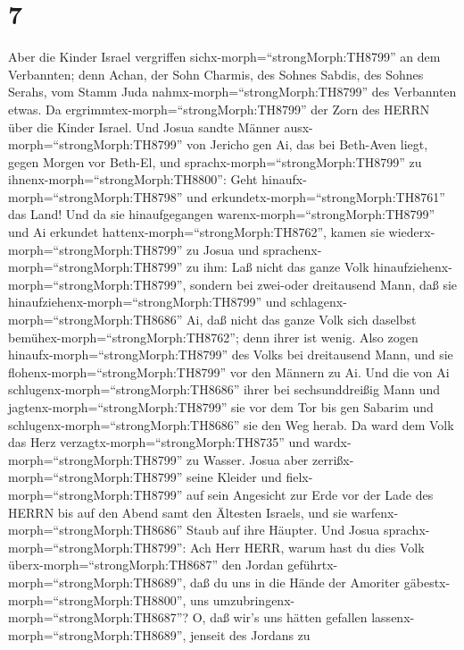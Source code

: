\hypertarget{section-6}{%
\section{7}\label{section-6}}

 Aber die Kinder Israel vergriffen
sichx-morph=``strongMorph:TH8799'' an dem Verbannten; denn Achan, der
Sohn Charmis, des Sohnes Sabdis, des Sohnes Serahs, vom Stamm Juda
nahmx-morph=``strongMorph:TH8799'' des Verbannten etwas. Da
ergrimmtex-morph=``strongMorph:TH8799'' der Zorn des HERRN über die
Kinder Israel.  Und Josua sandte Männer
ausx-morph=``strongMorph:TH8799'' von Jericho gen Ai, das bei Beth-Aven
liegt, gegen Morgen vor Beth-El, und
sprachx-morph=``strongMorph:TH8799'' zu
ihnenx-morph=``strongMorph:TH8800'': Geht
hinaufx-morph=``strongMorph:TH8798'' und
erkundetx-morph=``strongMorph:TH8761'' das Land! Und da sie
hinaufgegangen warenx-morph=``strongMorph:TH8799'' und Ai erkundet
hattenx-morph=``strongMorph:TH8762'',  kamen sie
wiederx-morph=``strongMorph:TH8799'' zu Josua und
sprachenx-morph=``strongMorph:TH8799'' zu ihm: Laß nicht das ganze Volk
hinaufziehenx-morph=``strongMorph:TH8799'', sondern bei zwei-oder
dreitausend Mann, daß sie hinaufziehenx-morph=``strongMorph:TH8799'' und
schlagenx-morph=``strongMorph:TH8686'' Ai, daß nicht das ganze Volk sich
daselbst bemühex-morph=``strongMorph:TH8762''; denn ihrer ist wenig.
 Also zogen hinaufx-morph=``strongMorph:TH8799'' des Volks
bei dreitausend Mann, und sie flohenx-morph=``strongMorph:TH8799'' vor
den Männern zu Ai.  Und die von Ai
schlugenx-morph=``strongMorph:TH8686'' ihrer bei sechsunddreißig Mann
und jagtenx-morph=``strongMorph:TH8799'' sie vor dem Tor bis gen Sabarim
und schlugenx-morph=``strongMorph:TH8686'' sie den Weg herab. Da ward
dem Volk das Herz verzagtx-morph=``strongMorph:TH8735'' und
wardx-morph=``strongMorph:TH8799'' zu Wasser.  Josua aber
zerrißx-morph=``strongMorph:TH8799'' seine Kleider und
fielx-morph=``strongMorph:TH8799'' auf sein Angesicht zur Erde vor der
Lade des HERRN bis auf den Abend samt den Ältesten Israels, und sie
warfenx-morph=``strongMorph:TH8686'' Staub auf ihre Häupter.
 Und Josua sprachx-morph=``strongMorph:TH8799'': Ach Herr
HERR, warum hast du dies Volk überx-morph=``strongMorph:TH8687'' den
Jordan geführtx-morph=``strongMorph:TH8689'', daß du uns in die Hände
der Amoriter gäbestx-morph=``strongMorph:TH8800'', uns
umzubringenx-morph=``strongMorph:TH8687''? O, daß wir's uns hätten
gefallen lassenx-morph=``strongMorph:TH8689'', jenseit des Jordans zu
